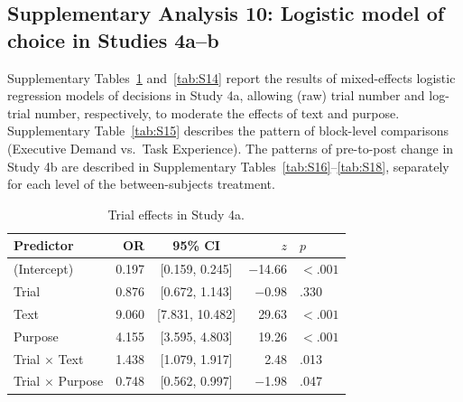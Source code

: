 \documentclass[pdflatex,sn-nature]{sn-jnl}
\begin{document}
\begin{appendices}
\FloatBarrier

\subsection*{Supplementary Analysis 10: Logistic model of choice in Studies 4a--b}
\label{supp:analysis10}

Supplementary Tables~\ref{tab:S13} and~\ref{tab:S14} report the results of mixed-effects logistic regression models of decisions in Study 4a, allowing (raw) trial number and log-trial number, respectively, to moderate the effects of text and purpose. Supplementary Table~\ref{tab:S15} describes the pattern of block-level comparisons (Executive Demand vs.\ Task Experience). The patterns of pre-to-post change in Study 4b are described in Supplementary Tables~\ref{tab:S16}--\ref{tab:S18}, separately for each level of the between-subjects treatment.

\begin{table}[htbp]
\caption{Trial effects in Study 4a.}
\label{tab:S13}
\begin{tabular*}{\textwidth}{@{\extracolsep{\fill}}lrcrl@{}}
\toprule
Predictor & OR & 95\% CI & $z$ & $p$ \\
\midrule
(Intercept)                  & 0.197 & [0.159, 0.245] & $-$14.66 & $<.001$ \\
Trial                        & 0.876 & [0.672, 1.143] & $-$0.98  & .330    \\
Text                         & 9.060 & [7.831, 10.482] & 29.63  & $<.001$ \\
Purpose                      & 4.155 & [3.595, 4.803] & 19.26   & $<.001$ \\
Trial $\times$ Text          & 1.438 & [1.079, 1.917] & 2.48    & .013    \\
Trial $\times$ Purpose       & 0.748 & [0.562, 0.997] & $-$1.98  & .047    \\
\bottomrule
\end{tabular*}
\end{table}


\end{appendices}
\end{document}
